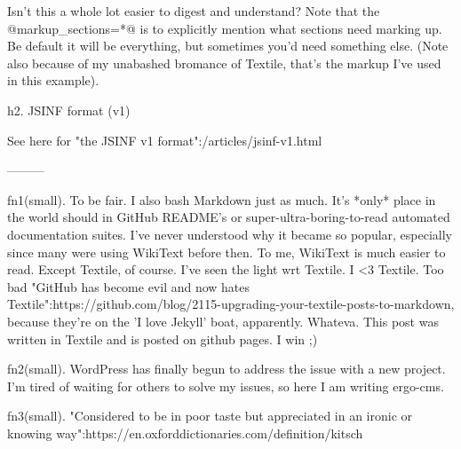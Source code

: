 Isn't this a whole lot easier to digest and understand? Note that the @markup_sections=*@ is to explicitly mention what sections need marking up. Be default it will be everything, but sometimes you'd need something else. (Note also because of my unabashed bromance of Textile, that's the markup I've used in this example).

h2. JSINF format (v1)

See here for "the JSINF v1 format":/articles/jsinf-v1.html

---------


fn1(small). To be fair. I also bash Markdown just as much. It's *only* place in the world should in GitHub README's or super-ultra-boring-to-read automated documentation suites. I've never understood why it became so popular, especially since many were using WikiText before then. To me, WikiText is much easier to read. Except Textile, of course. I've seen the light wrt Textile. I <3 Textile. Too bad "GitHub has become evil and now hates Textile":https://github.com/blog/2115-upgrading-your-textile-posts-to-markdown, because they're on the 'I love Jekyll' boat, apparently. Whateva. This post was written in Textile and is posted on github pages. I win ;)

fn2(small). WordPress has finally begun to address the issue with a new project. I'm tired of waiting for others to solve my issues, so here I am writing ergo-cms.

fn3(small). "Considered to be in poor taste but appreciated in an ironic or knowing way":https://en.oxforddictionaries.com/definition/kitsch


